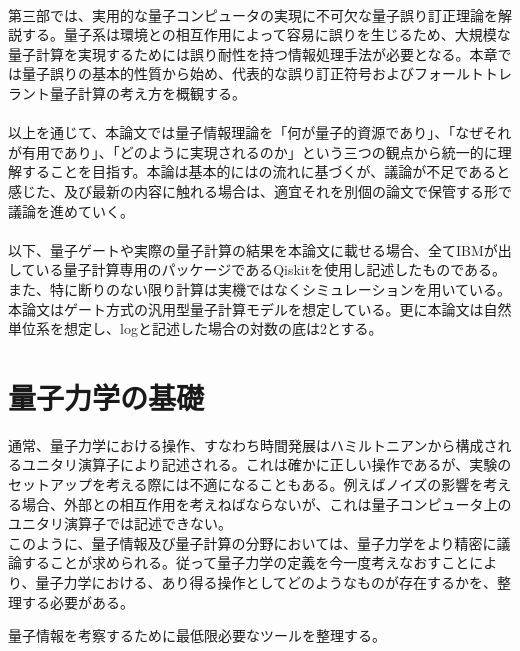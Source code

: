 \documentclass[a4paper,10.5pt]{article}
\numberwithin{equation}{section}
\begin{document}
\\
第三部では、実用的な量子コンピュータの実現に不可欠な量子誤り訂正理論を解説する。量子系は環境との相互作用によって容易に誤りを生じるため、大規模な量子計算を実現するためには誤り耐性を持つ情報処理手法が必要となる。本章では量子誤りの基本的性質から始め、代表的な誤り訂正符号およびフォールトトレラント量子計算の考え方を概観する。\\
\\
以上を通じて、本論文では量子情報理論を「何が量子的資源であり」、「なぜそれが有用であり」、「どのように実現されるのか」という三つの観点から統一的に理解することを目指す。本論は基本的には\cite{Nielsen:2012yss}の流れに基づくが、議論が不足であると感じた、及び最新の内容に触れる場合は、適宜それを別個の論文で保管する形で議論を進めていく。\\
\\
以下、量子ゲートや実際の量子計算の結果を本論文に載せる場合、全てIBMが出している量子計算専用のパッケージであるQiskitを使用し記述したものである。また、特に断りのない限り計算は実機ではなくシミュレーションを用いている。本論文はゲート方式の汎用型量子計算モデルを想定している。更に本論文は自然単位系を想定し、logと記述した場合の対数の底は2とする。\\


\section{量子力学の基礎}
通常、量子力学における操作、すなわち時間発展はハミルトニアンから構成されるユニタリ演算子により記述される。これは確かに正しい操作であるが、実験のセットアップを考える際には不適になることもある。例えばノイズの影響を考える場合、外部との相互作用を考えねばならないが、これは量子コンピュータ上のユニタリ演算子では記述できない。\\
このように、量子情報及び量子計算の分野においては、量子力学をより精密に議論することが求められる。従って量子力学の定義を今一度考えなおすことにより、量子力学における、あり得る操作としてどのようなものが存在するかを、整理する必要がある。
\begin{goalbox}
量子情報を考察するために最低限必要なツールを整理する。
\end{goalbox}
\end{document}
